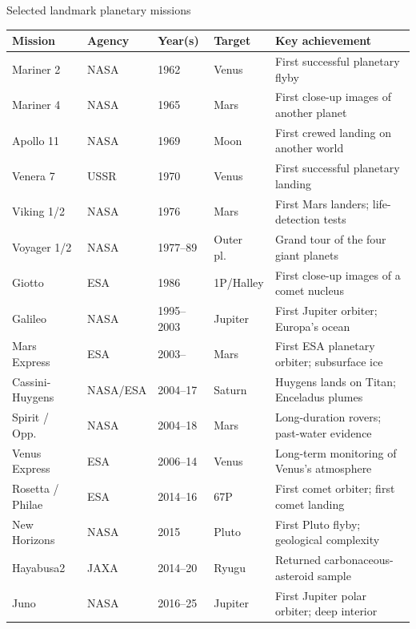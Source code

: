 \documentclass[aspectratio=169, 11pt]{beamer}
\begin{document}
\begin{frame}{Selected landmark planetary missions}
  \centering
  \scriptsize
  \setlength{\tabcolsep}{2.0pt}
  \renewcommand{\arraystretch}{0.9}
  \begin{tabular}{lllll}
    \toprule
    Mission & Agency & Year(s) & Target & Key achievement \\
    \midrule
    Mariner 2     & NASA      & 1962      & Venus       & First successful planetary flyby \\
    Mariner 4     & NASA      & 1965      & Mars        & First close-up images of another planet \\
    Apollo 11     & NASA      & 1969      & Moon        & First crewed landing on another world \\
    Venera 7      & USSR      & 1970      & Venus       & First successful planetary landing \\
    Viking 1/2    & NASA      & 1976      & Mars        & First Mars landers; life-detection tests \\
    Voyager 1/2   & NASA      & 1977--89  & Outer pl.\  & Grand tour of the four giant planets \\
    Giotto        & ESA       & 1986      & 1P/Halley   & First close-up images of a comet nucleus \\
    Galileo       & NASA      & 1995--2003& Jupiter     & First Jupiter orbiter; Europa's ocean \\
    Mars Express  & ESA       & 2003--    & Mars        & First ESA planetary orbiter; subsurface ice \\
    Cassini-Huygens & NASA/ESA & 2004--17 & Saturn     & Huygens lands on Titan; Enceladus plumes \\
    Spirit / Opp.\ & NASA     & 2004--18  & Mars        & Long-duration rovers; past-water evidence \\
    Venus Express & ESA       & 2006--14  & Venus       & Long-term monitoring of Venus's atmosphere \\
    Rosetta / Philae & ESA    & 2014--16  & 67P         & First comet orbiter; first comet landing \\
    New Horizons  & NASA      & 2015      & Pluto       & First Pluto flyby; geological complexity \\
    Hayabusa2     & JAXA      & 2014--20  & Ryugu       & Returned carbonaceous-asteroid sample \\
    Juno          & NASA      & 2016--25  & Jupiter     & First Jupiter polar orbiter; deep interior \\

\end{tabular}
\end{frame}
\end{document}
